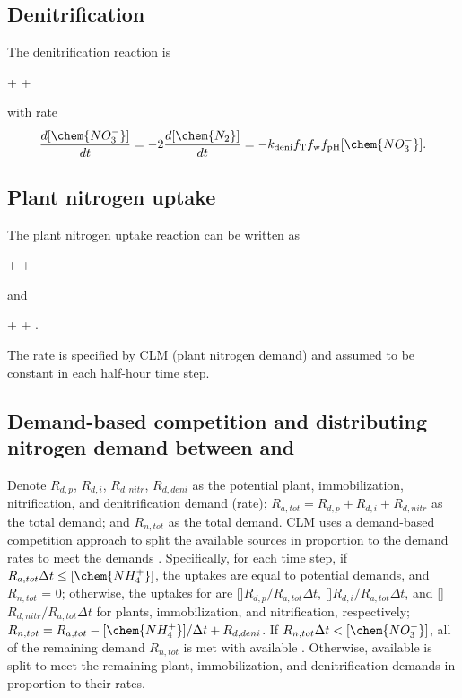 \documentclass[gmd, manuscript]{copernicus}
\begin{document}
\subsection{Denitrification} 
The denitrification reaction is
\begin{reaction}
 + \cdots {}  + \cdots
\label{rxn:deni}
\end{reaction}
with rate \citep{Dickinson2002} 
\begin{equation} 
\frac{d [\chem{NO_3^-}]}{d t} = -2\frac{d
[\chem{N_2}]}{d t} = -k_\text{deni} f_\text{T} f_\text{w}
f_\text{pH}[\chem{NO_3^-}].
\label{eq:deni}
\end{equation}

\subsection{Plant nitrogen uptake}
The plant nitrogen uptake reaction can be written as
\begin{reaction}
 + \cdots \rightarrow {} + \cdots
\label{rxn:plantatake}
\end{reaction}
and
\begin{reaction}
 + \cdots \rightarrow {} + \cdots.
\label{rxn:plantntake}
\end{reaction}
The rate is specified by CLM (plant nitrogen demand) and assumed to be
constant in each half-hour time step. 

\subsection{Demand-based competition and distributing nitrogen demand between  and }
\label{sec:demandbasedcompetition}
Denote $R_{d,p}$, $R_{d,i}$, $R_{d,nitr}$, $R_{d,deni}$ as the potential plant,
immobilization, nitrification, and denitrification demand (rate);
$R_{a,tot}=R_{d,p}+R_{d,i}+R_{d,nitr}$ as the total  demand; and
$R_{n,tot}$ as the total  demand. CLM uses a demand-based
competition approach to split the available sources in proportion to the demand
rates to meet the demands \citep{Oleson2013,Thornton2005}. Specifically, for
each time step, if $R_{a,tot}\Delta t \leq [\chem{NH_4^+}]$, the uptakes are
equal to potential demands, and $R_{n,tot}$ = 0; otherwise, the uptakes for
 are []$R_{d,p}/R_{a,tot}\Delta t$,
[]$R_{d,i}/R_{a,tot}\Delta t$, and
[]$R_{d,nitr}/R_{a,tot}\Delta t$ for plants, immobilization, and
nitrification, respectively; $R_{n,tot}=R_{a,tot}-[\chem{NH_4^+}]/\Delta t +
R_{d,deni}$. If $R_{n,tot}\Delta t < [\chem{NO_3^-}]$, all of the remaining
demand $R_{n,tot}$ is met with available . Otherwise, available
 is split to meet the remaining plant, immobilization, and
denitrification demands in proportion to their rates. 
\end{document}

